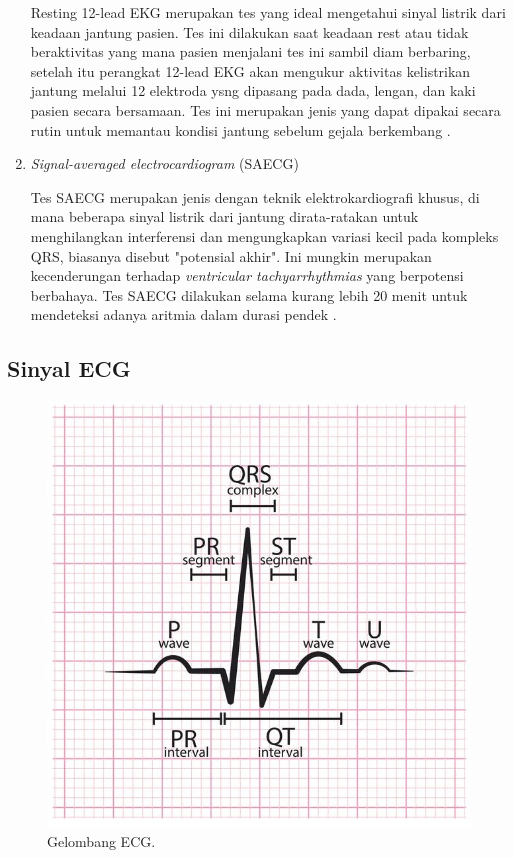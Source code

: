\begin{enumerate}
	Resting 12-lead EKG merupakan tes yang ideal mengetahui sinyal listrik dari keadaan jantung pasien. Tes ini dilakukan saat keadaan rest atau tidak beraktivitas yang mana pasien menjalani tes ini sambil diam berbaring, setelah itu perangkat 12-lead EKG akan mengukur aktivitas kelistrikan jantung melalui 12 elektroda ysng dipasang pada dada, lengan, dan kaki pasien secara bersamaan.
	Tes ini merupakan jenis yang dapat dipakai secara rutin untuk memantau kondisi jantung sebelum gejala berkembang \cite{cit:14}.
	\vspace{-2mm}
	\item \textit{Signal-averaged electrocardiogram }(SAECG)  
	\vspace{1ex}
	
	Tes SAECG merupakan jenis dengan teknik elektrokardiografi khusus, di mana beberapa sinyal listrik dari jantung dirata-ratakan untuk menghilangkan interferensi dan mengungkapkan variasi kecil pada kompleks QRS, biasanya disebut "potensial akhir". Ini mungkin merupakan kecenderungan terhadap \textit{ventricular tachyarrhythmias} yang berpotensi berbahaya. Tes SAECG dilakukan selama kurang lebih 20 menit untuk mendeteksi adanya aritmia dalam durasi pendek \cite{cit:14}.
\end{enumerate}

\subsection{Sinyal ECG}
\begin{figure}[H]
	\begin{center}\centering
		\includegraphics[scale=0.3]{img/Sinyal ecg}
		\caption{Gelombang ECG.}
		\label{fig:2.0}
	\end{center}
\end{figure}

